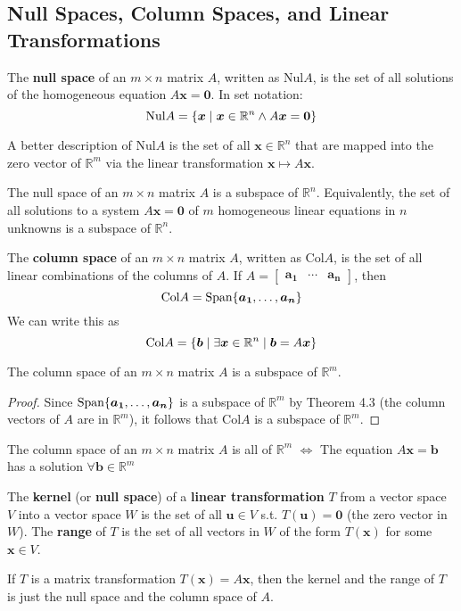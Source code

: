 \documentclass[11pt]{scrartcl}
\theoremstyle{dotlessP}
\theoremstyle{dotlessN}
\DeclarePairedDelimiter\set{\{}{\}}
\newcommand{\reals}{\mathbb{R}} %
\newcommand{\nul}{\text{Nul}}
\newcommand{\col}{\text{Col}}
\newcommand{\spa}[1]{\text{Span}\set*{#1}}
\begin{document}
\subsection{Null Spaces, Column Spaces, and Linear Transformations}
\begin{definition}
	The \textbf{null space} of an $m \times n$ matrix $A$, written as $\nul A$, is the set of all solutions of the homogeneous equation $A\bm{x} = \bm{0}$. In set notation:
	\[
		\nul A = \set*{\bm{x} \mid \bm{x} \in \reals^n \land A\bm{x} = \bm{0}}
	\] 
\end{definition}
\begin{remark}
	A better description of $\nul A$ is the set of all $\bm{x} \in \reals^n$ that are mapped into the zero vector of $\reals^m$ via the linear transformation $\bm{x} \mapsto A\bm{x}$.
\end{remark}
\begin{theorem}
	The null space of an $m \times n$ matrix $A$ is a subspace of $\reals^n$. Equivalently, the set of all solutions to a system $A\bm{x} = \bm{0}$ of $m$ homogeneous linear equations in $n$ unknowns is a subspace of $\reals^n$.
\end{theorem}
\begin{definition}
	The \textbf{column space} of an $m \times n$ matrix $A$, written as $\col A$, is the set of all linear combinations of the columns of $A$. If $A  = 
\begin{bmatrix}
	\bm{a_1} & \cdots & \bm{a_n}
\end{bmatrix}
	$, then
	\[
		\col A = \spa{\bm{a_1}, \dots, \bm{a_n}}
	\] 
	We can write this as
	\[
		\col A = \set*{\bm{b} \mid \exists \bm{x} \in \reals^n \mid \bm{b} = A\bm{x}}
	\] 
\end{definition}
\begin{theorem}
	The column space of an $m \times n$ matrix $A$ is a subspace of $\reals^m$.
\end{theorem}
\begin{proof}
	Since $\spa{\bm{a_1}, \dots, \bm{a_n}}$ is a subspace of $\reals^m$ by Theorem 4.3 (the column vectors of $A$ are in  $\reals^m$), it follows that $\col A$ is a subspace of $\reals^m$.
\end{proof}
\begin{remark}
	The column space of an $m \times n$ matrix $A$ is all of $\reals^m$ $\iff$ The equation $A\bm{x} = \bm{b}$ has a solution $\forall \bm{b} \in \reals^m$
\end{remark}
\begin{definition}
	The \textbf{kernel} (or \textbf{null space}) of a \textbf{linear transformation} $T$ from a vector space $V$ into a vector space $W$ is the set of all $\bm{u} \in V$ s.t. $T(\bm{u}) = \bm{0}$ (the zero vector in $W$). The \textbf{range} of $T$ is the set of all vectors in $W$ of the form $T(\bm{x})$ for some $\bm{x} \in V$.
\end{definition}
\begin{remark}
	If $T$ is a matrix transformation $T(\bm{x}) = A\bm{x}$, then the kernel and the range of $T$ is just the null space and the column space of $A$.
\end{remark}
\end{document}
